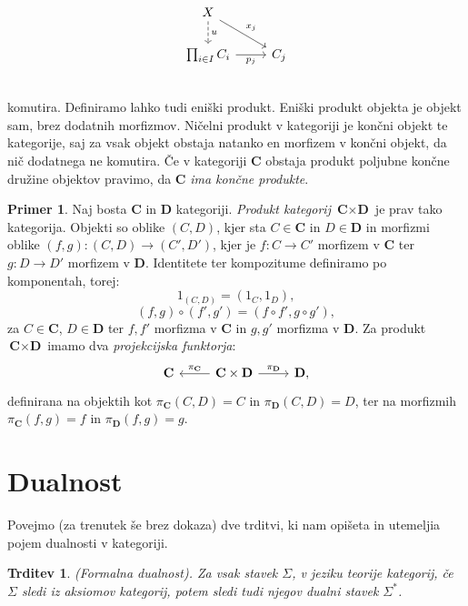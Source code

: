 \documentclass[12pt,a4paper]{book}
\theoremstyle{definition}
\theoremstyle{plain}
\newtheorem{trditev}[definicija]{Trditev}
\theoremstyle{definition}
\newtheorem{primer}{Primer}[section]
\theoremstyle{remark}
\newcommand{\cat}[1]{\textbf{#1}}
\begin{document}
$$\begin{tikzcd}
X \ar[d, dashed, "u"] \ar[dr, "x_j"] & \\
\prod_{i \in I}C_i \ar[r, "p_j"'] & C_j \\
\end{tikzcd}$$
komutira.
%
Definiramo lahko tudi eniški produkt. Eniški produkt objekta je objekt sam, brez dodatnih morfizmov. Ničelni produkt v kategoriji je končni objekt te kategorije, saj za vsak objekt obstaja natanko en morfizem v končni objekt, da nič dodatnega ne komutira. Če v kategoriji $\cat{C}$ obstaja produkt poljubne končne družine objektov pravimo, da $\cat{C}$ \emph{ima končne produkte}.
%
\begin{primer}
Naj bosta $\cat{C}$ in $\cat{D}$ kategoriji. \emph{Produkt kategorij} $\cat{C} \times \cat{D}$ je prav tako kategorija. Objekti so oblike $(C,D)$, kjer sta $C \in \cat{C}$ in $D \in \cat{D}$ in morfizmi oblike $(f,g) : (C,D) \to (C',D')$, kjer je $f : C \to C'$ morfizem v $\cat{C}$ ter $g : D \to D'$ morfizem v $\cat{D}$. Identitete ter kompozitume definiramo po komponentah, torej:
\begin{equation*}
1_{(C,D)} = (1_C,1_D),
\end{equation*}
\begin{equation*}
(f,g) \circ (f',g') = (f \circ f', g \circ g'),
\end{equation*}
za $C \in \cat{C}$, $D \in \cat{D}$ ter $f,f'$ morfizma v $\cat{C}$ in $g,g'$ morfizma v $\cat{D}$.
Za produkt $\cat{C} \times \cat{D}$ imamo dva \textit{projekcijska funktorja}:
\[
\begin{tikzcd}
\cat{C} & \arrow[l, "\pi_{\cat{C}}"'] \cat{C} \times \cat{D} \arrow[r, "\pi_{\cat{D}}"] & \cat{D},
\end{tikzcd}
\]
definirana na objektih kot $\pi_{\cat{C}}(C,D) = C$ in $\pi_{\cat{D}}(C,D) = D$, ter na morfizmih $\pi_{\cat{C}}(f,g) = f$ in $\pi_{\cat{D}}(f,g) = g$.
\end{primer}

\section{Dualnost}
Povejmo (za trenutek še brez dokaza) dve trditvi, ki nam opišeta in utemeljia pojem dualnosti v kategoriji.

\begin{trditev} \emph{(Formalna dualnost)}. 
Za vsak stavek $\Sigma$, v jeziku teorije kategorij, če $\Sigma$ sledi iz aksiomov kategorij, potem sledi tudi njegov dualni stavek $\Sigma^*$.
\end{trditev}
\end{document}
